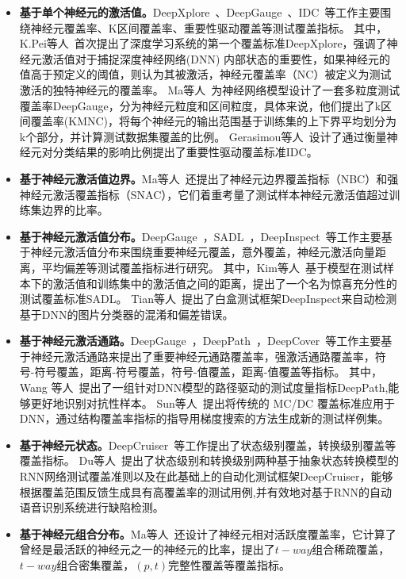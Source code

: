 \begin{itemize}
\item \textbf{基于单个神经元的激活值。}DeepXplore~、DeepGauge~、IDC~等工作主要围绕神经元覆盖率、K区间覆盖率、重要性驱动覆盖等测试覆盖指标。
其中，K.Pei等人~首次提出了深度学习系统的第一个覆盖标准DeepXplore，强调了神经元激活值对于捕捉深度神经网络(DNN) 内部状态的重要性，如果神经元的值高于预定义的阈值，则认为其被激活，神经元覆盖率（NC）被定义为测试激活的独特神经元的覆盖率。
Ma等人~为神经网络模型设计了一套多粒度测试覆盖率DeepGauge，分为神经元粒度和区间粒度，具体来说，他们提出了k区间覆盖率(KMNC)，将每个神经元的输出范围基于训练集的上下界平均划分为k个部分，并计算测试数据集覆盖的比例。
Gerasimou等人~设计了通过衡量神经元对分类结果的影响比例提出了重要性驱动覆盖标准IDC。

\item \textbf{基于神经元激活值边界。}Ma等人~还提出了神经元边界覆盖指标（NBC）和强神经元激活覆盖指标（SNAC），它们着重考量了测试样本神经元激活值超过训练集边界的比率。

\item \textbf{基于神经元激活值分布。}DeepGauge~，SADL~，DeepInspect~等工作主要基于神经元激活值分布来围绕重要神经元覆盖，意外覆盖，神经元激活向量距离，平均偏差等测试覆盖指标进行研究。
其中，Kim等人~基于模型在测试样本下的激活值和训练集中的激活值之间的距离，提出了一个名为惊喜充分性的测试覆盖标准SADL。
Tian等人~提出了白盒测试框架DeepInspect来自动检测基于DNN的图片分类器的混淆和偏差错误。

\item \textbf{基于神经元激活通路。}DeepGauge~，DeepPath~，DeepCover~等工作主要基于神经元激活通路来提出了重要神经元通路覆盖率，强激活通路覆盖率，符号-符号覆盖，距离-符号覆盖，符号-值覆盖，距离-值覆盖等指标。
其中，Wang 等人~提出了一组针对DNN模型的路径驱动的测试度量指标DeepPath,能够更好地识别对抗性样本。
Sun等人~提出将传统的 MC/DC 覆盖标准应用于DNN，通过结构覆盖率指标的指导用梯度搜索的方法生成新的测试样例集。

\item \textbf{基于神经元状态。}DeepCruiser~等工作提出了状态级别覆盖，转换级别覆盖等覆盖指标。
Du等人~提出了状态级别和转换级别两种基于抽象状态转换模型的RNN网络测试覆盖准则以及在此基础上的自动化测试框架DeepCruiser，能够根据覆盖范围反馈生成具有高覆盖率的测试用例,并有效地对基于RNN的自动语音识别系统进行缺陷检测。

\item \textbf{基于神经元组合分布。}Ma等人~还设计了神经元相对活跃度覆盖率，它计算了曾经是最活跃的神经元之一的神经元的比率，提出了$t-way$组合稀疏覆盖，$t-way$组合密集覆盖，$(p,t)$完整性覆盖等覆盖指标。
\end{itemize}

